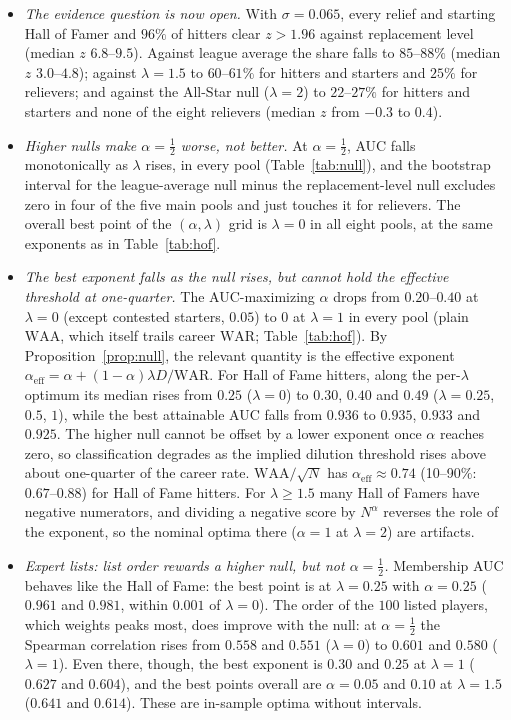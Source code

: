\documentclass[11pt,letterpaper]{article}
\theoremstyle{plain}
\theoremstyle{definition}
\theoremstyle{remark}
\newcommand{\WAR}{\mathrm{WAR}}
\newcommand{\WAA}{\mathrm{WAA}}
\begin{document}
\begin{itemize}
    \item \emph{The evidence question is now open.} With $\sigma = 0.065$, every relief and starting Hall of Famer and $96\%$ of hitters clear $z > 1.96$ against replacement level (median $z$ $6.8$--$9.5$). Against league average the share falls to $85$--$88\%$ (median $z$ $3.0$--$4.8$); against $\lambda = 1.5$ to $60$--$61\%$ for hitters and starters and $25\%$ for relievers; and against the All-Star null ($\lambda = 2$) to $22$--$27\%$ for hitters and starters and none of the eight relievers (median $z$ from $-0.3$ to $0.4$).
    \item \emph{Higher nulls make $\alpha = \tfrac12$ worse, not better.} At $\alpha = \tfrac12$, AUC falls monotonically as $\lambda$ rises, in every pool (Table~\ref{tab:null}), and the bootstrap interval for the league-average null minus the replacement-level null excludes zero in four of the five main pools and just touches it for relievers. The overall best point of the $(\alpha, \lambda)$ grid is $\lambda = 0$ in all eight pools, at the same exponents as in Table~\ref{tab:hof}.
    \item \emph{The best exponent falls as the null rises, but cannot hold the effective threshold at one-quarter.} The AUC-maximizing $\alpha$ drops from $0.20$--$0.40$ at $\lambda = 0$ (except contested starters, $0.05$) to $0$ at $\lambda = 1$ in every pool (plain $\WAA$, which itself trails career $\WAR$; Table~\ref{tab:hof}). By Proposition~\ref{prop:null}, the relevant quantity is the effective exponent $\alpha_{\mathrm{eff}} = \alpha + (1-\alpha)\lambda D/\WAR$. For Hall of Fame hitters, along the per-$\lambda$ optimum its median rises from $0.25$ ($\lambda = 0$) to $0.30$, $0.40$ and $0.49$ ($\lambda = 0.25$, $0.5$, $1$), while the best attainable AUC falls from $0.936$ to $0.935$, $0.933$ and $0.925$. The higher null cannot be offset by a lower exponent once $\alpha$ reaches zero, so classification degrades as the implied dilution threshold rises above about one-quarter of the career rate. $\WAA/\sqrt N$ has $\alpha_{\mathrm{eff}} \approx 0.74$ (10--90\%: $0.67$--$0.88$) for Hall of Fame hitters. For $\lambda \ge 1.5$ many Hall of Famers have negative numerators, and dividing a negative score by $N^{\alpha}$ reverses the role of the exponent, so the nominal optima there ($\alpha = 1$ at $\lambda = 2$) are artifacts.
    \item \emph{Expert lists: list order rewards a higher null, but not $\alpha = \tfrac12$.} Membership AUC behaves like the Hall of Fame: the best point is at $\lambda = 0.25$ with $\alpha = 0.25$ ($0.961$ and $0.981$, within $0.001$ of $\lambda = 0$). The order of the $100$ listed players, which weights peaks most, does improve with the null: at $\alpha = \tfrac12$ the Spearman correlation rises from $0.558$ and $0.551$ ($\lambda = 0$) to $0.601$ and $0.580$ ($\lambda = 1$). Even there, though, the best exponent is $0.30$ and $0.25$ at $\lambda = 1$ ($0.627$ and $0.604$), and the best points overall are $\alpha = 0.05$ and $0.10$ at $\lambda = 1.5$ ($0.641$ and $0.614$). These are in-sample optima without intervals.
\end{itemize}
\end{document}
